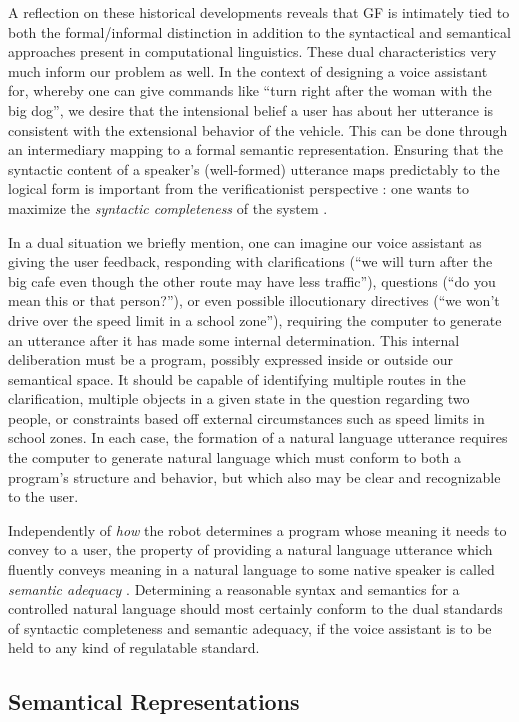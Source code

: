 \documentclass[a4paper, 11pt]{article}
\begin{document}
A reflection on these historical developments reveals that GF is intimately tied
to both the formal/informal distinction in addition to the syntactical and
semantical approaches present in computational linguistics. These dual characteristics
very much inform our problem as well. In the context of designing a voice
assistant for, whereby one can give commands like ``turn
right after the woman with the big dog'', we desire that the intensional belief a
user has about her utterance is consistent with the extensional behavior of the
vehicle. This can be done through an intermediary mapping to a formal semantic
representation. Ensuring that the syntactic content of a speaker's
(well-formed) utterance maps predictably to the logical form is important from
the verificationist perspective : one wants to maximize the \emph{syntactic
completeness} of the system \cite{macmillan2021}.

In a dual situation we briefly mention, one can imagine our voice assistant as
giving the user feedback, responding with clarifications (``we will turn after
the big cafe even though the other route may have less traffic''), questions
(``do you mean this or that person?''), or even possible illocutionary
directives (``we won't drive over the speed limit in a school zone''), requiring
the computer to generate an utterance after it has made some internal
determination. This internal deliberation must be a program, possibly expressed
inside or outside our semantical space. It should be capable of identifying
multiple routes in the clarification, multiple objects in a given state in the
question regarding two people, or constraints based off external circumstances
such as speed limits in school zones. In each case, the formation of a natural
language utterance requires the computer to generate natural language which must
conform to both a program's structure and behavior, but which also may be clear
and recognizable to the user.

Independently of \emph{how} the robot determines a program whose meaning it
needs to convey to a user, the property of providing a natural language
utterance which fluently conveys meaning in a natural language to some native
speaker is called \emph{semantic adequacy} \cite{macmillan2021}. Determining a
reasonable syntax and semantics for a controlled natural language should most
certainly conform to the dual standards of syntactic completeness and semantic
adequacy, if the voice assistant is to be held to any kind of regulatable
standard.

\subsection{Semantical Representations}
\end{document}
